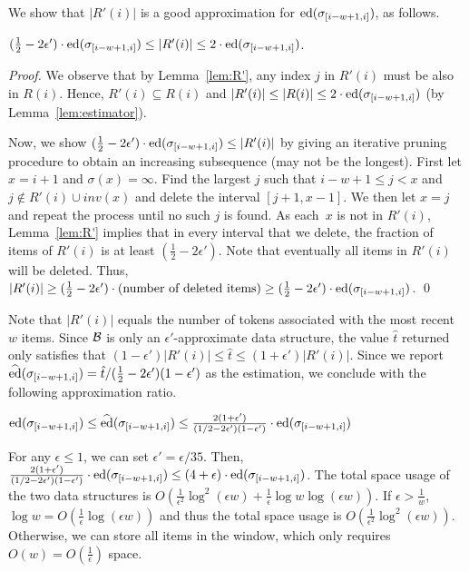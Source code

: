 \documentclass{llncs}
\newcommand{\ed}{{\rm ed}}
\newcommand{\aed}{\widehat \ed}
\newcommand{\swi}{\sigma_{[i-w+1,i]}}
\newcommand{\eps}{\epsilon}
\begin{document}
We show that $|R'(i)|$ is a good approximation
for $\ed(\swi)$, as follows.

\begin{lemma} \label{lem:approx-estimator}
$(\frac{1}{2}-2\epsilon')\cdot \ed(\swi) \le |R'(i)|
\le 2 \cdot \ed(\swi)$.
\end{lemma}
\begin{proof}
  We observe that by Lemma~\ref{lem:R'},
  any index $j$ in $R'(i)$ must be also
  in $R(i)$. Hence, $R'(i) \subseteq R(i)$ and
  $|R'(i)| \le |R(i)| \le 2 \cdot \ed(\swi)$
  (by Lemma~\ref{lem:estimator}).

  Now, we show $(\frac{1}{2} - 2\epsilon')\cdot \ed(\swi) \le |R'(i)|$ by giving an iterative pruning procedure to obtain an
  increasing subsequence (may not be the longest).  First let
  $x = i+1$ and
  $\sigma(x) = \infty$.  Find the largest $j$ such that $i-w+1\le j<x$ and
  $j\notin R'(i) \cup inv(x)$ and delete the interval $[j+1,x-1]$.
  We then let $x=j$ and repeat the process
  until no such $j$ is found.
  As each~$x$ is not in $R'(i)$,
  Lemma~\ref{lem:R'} implies that in every interval
  that we delete, the fraction of items of $R'(i)$ is at
  least $(\frac{1}{2}-2\epsilon')$.
  Note that eventually all items in $R'(i)$ will be deleted.
  Thus, $|R'(i)|
  \ge (\frac{1}{2}-2\epsilon')\cdot \mbox{(number of deleted items)} \ge
  (\frac{1}{2}-2\epsilon')\cdot \ed(\swi)$.
\hfill\qed
\end{proof}

Note that $|R'(i)|$ equals the number of tokens associated
with the most recent $w$ items. Since $\cal B$ is only an $\eps'$-approximate
data structure, the value $\hat t$ returned only satisfies that
$(1-\epsilon')|R'(i)| \le \hat t \le (1+\epsilon')|R'(i)|$.
Since we report $\aed(\swi) = \hat t / (\frac{1}{2}-2\epsilon')( 1-\epsilon')$ as
the estimation, we conclude with the following approximation ratio.

\begin{lemma}
$\ed(\swi) \le \aed(\swi)
\le \frac{2(1+\epsilon')}{(1/2-2\epsilon')(1-\epsilon')} \cdot \ed(\swi)$
\end{lemma}

For any $\epsilon \le 1$, we can set $\epsilon' = \epsilon/35$.
Then, $\frac{2(1+\epsilon')}{(1/2-2\epsilon')(1-\epsilon')} \cdot \ed(\swi) \le (4+\epsilon)\cdot \ed(\swi)$.
The total space usage of the two data structures is
$O(\frac{1}{\eps^2}\log ^2(\eps w) + \frac{1}{\eps} \log w \log(\eps w))$.
If $\eps > \frac{1}{w}$, $\log w = O(\frac{1}{\eps} \log (\eps w))$
and thus the total space usage is $O(\frac{1}{\eps^2}\log ^2(\eps w))$.
Otherwise, we can store all items in the window, which
only requires $O(w) = O(\frac{1}{\eps})$ space.
\end{document}

